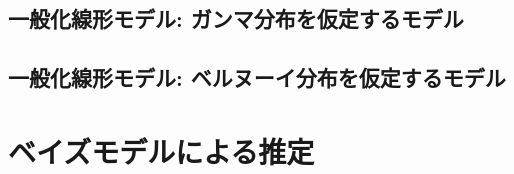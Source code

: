 \documentclass[a4j,11pt,mc]{jreport}
\begin{document}
	\section{一般化線形モデル: ガンマ分布を仮定するモデル}


	\section{一般化線形モデル: ベルヌーイ分布を仮定するモデル}

\chapter{ベイズモデルによる推定}\label{chapter:bayes}
%
%
%
%
%
%
%
%
%
%
%
%
%
%
%
%
%
%
%
%
%
%
\end{document}
